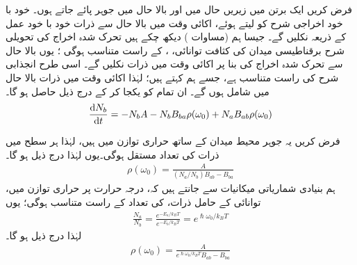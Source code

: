 
فرض کریں ایک برتن میں زیریں حال  میں  اور بالا حال  میں  جوہر پائے جاتے ہوں۔ خود با خود اخراجی شرح کو   لیتے ہوئے،   اکائی وقت میں بالا حال سے   ذرات خود با خود عمل کے ذریعہ نکلیں   گے۔   جیسا ہم (مساوات )  دیکھ چکے ہیں تحرک شدہ اخراج کی تحویلی شرح برقناطیسی میدان کی کثافت توانائی، ،  کے راست متناسب ہوگی ؛  یوں بالا حال سے  تحرک شدہ اخراج کی بنا پر اکائی وقت میں  ذرات  نکلیں  گے۔ اسی طرح  انجذابی   شرح   کی  راست متناسب ہے،  جسے ہم  کہتے ہیں؛  لہٰذا اکائی وقت میں  ذرات بالا حال میں شامل ہوں گے۔ ان تمام کو یکجا کر کے درج ذیل حاصل ہو گا۔
\begin{align}
	\frac{\dif N_b}{\dif t} = -N_bA-N_bB_{ba}\rho(\omega_0)+N_aB_{ab}\rho(\omega_0)
\end{align}

فرض کریں یہ   جوہر محیط   میدان کے ساتھ  حراری توازن میں ہیں،  لہٰذا  ہر  سطح میں ذرات کی تعداد مستقل ہوگی۔یوں   لہٰذا  درج ذیل  ہو گا۔
\begin{align}
	\rho(\omega_0) = \frac{A}{(N_a/N_b)B_{ab}-B_{ba}}
\end{align}
ہم بنیادی شماریاتی میکانیات سے جانتے ہیں کہ،  درجہ حرارت  پر حراری توازن میں،  توانائی  کے حامل  ذرات، کی تعداد       کے راست متناسب ہوگی؛ یوں
\begin{align}
	\frac{N_a}{N_b} = \frac{e^{-E_a/k_{B}T}}{e^{-E_b/k_BT}} = e^{\hslash\omega_0/k_BT}
\end{align}
لہٰذا  درج ذیل ہو گا۔
\begin{align}
	\rho(\omega_0) = \frac{A}{e^{\hslash\omega_0/k_BT}B_{ab}-B_{ba}}
\end{align}

